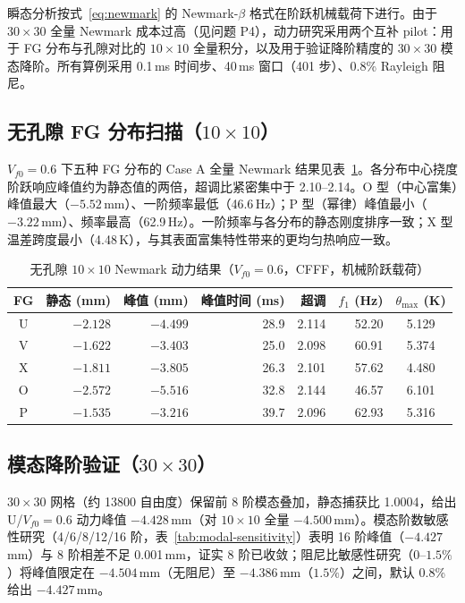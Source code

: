 \documentclass[11pt,a4paper]{ctexart}
\begin{document}
瞬态分析按式~\eqref{eq:newmark} 的 Newmark-$\beta$ 格式在阶跃机械载荷下进行。由于 $30\times30$ 全量 Newmark 成本过高（见问题 P4），动力研究采用两个互补 pilot：用于 FG 分布与孔隙对比的 $10\times10$ 全量积分，以及用于验证降阶精度的 $30\times30$ 模态降阶。所有算例采用 0.1\,ms 时间步、40\,ms 窗口（401 步）、0.8\% Rayleigh 阻尼。

\subsection{无孔隙 FG 分布扫描（$10\times10$）}

$V_{f0}=0.6$ 下五种 FG 分布的 Case A 全量 Newmark 结果见表~\ref{tab:dyn-fg}。各分布中心挠度阶跃响应峰值约为静态值的两倍，超调比紧密集中于 2.10--2.14。O 型（中心富集）峰值最大（$-5.52$\,mm）、一阶频率最低（46.6\,Hz）；P 型（幂律）峰值最小（$-3.22$\,mm）、频率最高（62.9\,Hz）。一阶频率与各分布的静态刚度排序一致；X 型温差跨度最小（4.48\,K），与其表面富集特性带来的更均匀热响应一致。

\begin{table}[H]
\centering
\caption{无孔隙 $10\times10$ Newmark 动力结果（$V_{f0}=0.6$，CFFF，机械阶跃载荷）}
\label{tab:dyn-fg}
\small
\begin{tabular}{crrrrrc}
\toprule
\textbf{FG} & \textbf{静态} (mm) & \textbf{峰值} (mm) & \textbf{峰值时间} (ms) & \textbf{超调} & $f_1$ \textbf{(Hz)} & $\theta_{\max}$ \textbf{(K)} \\
\midrule
U & $-2.128$ & $-4.499$ & 28.9 & 2.114 & 52.20 & 5.129 \\
V & $-1.622$ & $-3.403$ & 25.0 & 2.098 & 60.91 & 5.374 \\
X & $-1.811$ & $-3.805$ & 26.3 & 2.101 & 57.62 & 4.480 \\
O & $-2.572$ & $-5.516$ & 32.8 & 2.144 & 46.57 & 6.101 \\
P & $-1.535$ & $-3.216$ & 39.7 & 2.096 & 62.93 & 5.316 \\
\bottomrule
\end{tabular}
\end{table}

\subsection{模态降阶验证（$30\times30$）}

$30\times30$ 网格（约 13800 自由度）保留前 8 阶模态叠加，静态捕获比 1.0004，给出 U/$V_{f0}=0.6$ 动力峰值 $-4.428$\,mm（对 $10\times10$ 全量 $-4.500$\,mm）。模态阶数敏感性研究（4/6/8/12/16 阶，表~\ref{tab:modal-sensitivity}）表明 16 阶峰值（$-4.427$\,mm）与 8 阶相差不足 0.001\,mm，证实 8 阶已收敛；阻尼比敏感性研究（$0$--$1.5\%$）将峰值限定在 $-4.504$\,mm（无阻尼）至 $-4.386$\,mm（$1.5\%$）之间，默认 0.8\% 给出 $-4.427$\,mm。
\end{document}

